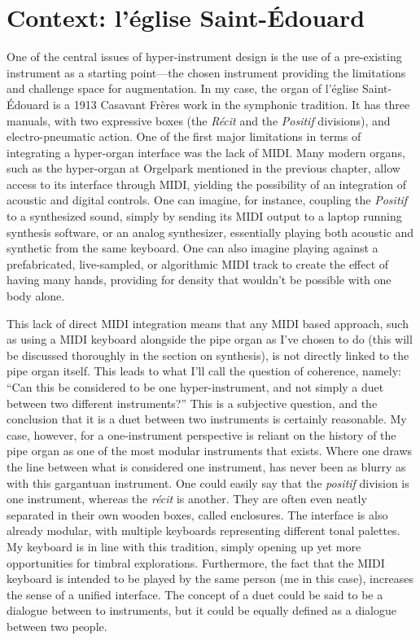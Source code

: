 \documentclass[12pt,twoside,maitrise]{dms_ks}
\theoremstyle{definition}
\begin{document}
{{\section{Context: l'église Saint-Édouard}

One of the central issues of hyper-instrument design is the use of a pre-existing instrument as a starting point---the chosen instrument providing the limitations and challenge space for augmentation. 
In my case, the organ of l'église Saint-Édouard is a 1913 Casavant Frères work in the symphonic tradition. 
It has three manuals, with two expressive boxes (the \textit{Récit} and the \textit{Positif} divisions), and electro-pneumatic action. 
One of the first major limitations in terms of integrating a hyper-organ interface was the lack of MIDI. 
Many modern organs, such as the hyper-organ at Orgelpark mentioned in the previous chapter, allow access to its interface through MIDI, yielding the possibility of an integration of acoustic and digital controls. 
One can imagine, for instance, coupling the \textit{Positif} to a synthesized sound, simply by sending its MIDI output to a laptop running synthesis software, or an analog synthesizer, essentially playing both acoustic and synthetic from the same keyboard. 
One can also imagine playing against a prefabricated, live-sampled, or algorithmic MIDI track to create the effect of having many hands, providing for density that wouldn't be possible with one body alone.

This lack of direct MIDI integration means that any MIDI based approach, such as using a MIDI keyboard alongside the pipe organ as I've chosen to do (this will be discussed thoroughly in the section on synthesis), is not directly linked to the pipe organ itself.
This leads to what I'll call the question of coherence, namely: “Can this be considered to be one hyper-instrument, and not simply a duet between two different instruments?”
This is a subjective question, and the conclusion that it is a duet between two instruments is certainly reasonable.
My case, however, for a one-instrument perspective is reliant on the history of the pipe organ as one of the most modular instruments that exists.
Where one draws the line between what is considered one instrument, has never been as blurry as with this gargantuan instrument.
One could easily say that the \textit{positif} division is one instrument, whereas the \textit{récit} is another.
They are often even neatly separated in their own wooden boxes, called enclosures.
The interface is also already modular, with multiple keyboards representing different tonal palettes.
My keyboard is in line with this tradition, simply opening up yet more opportunities for timbral explorations.
Furthermore, the fact that the MIDI keyboard is intended to be played by the same person (me in this case), increases the sense of a unified interface.
The concept of a duet could be said to be a dialogue between to instruments, but it could be equally defined as a dialogue between two people.

}}
\end{document}
